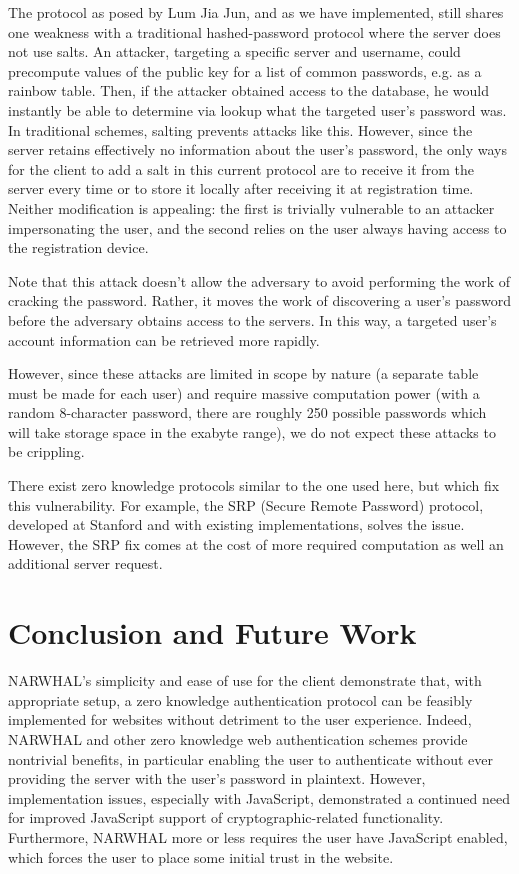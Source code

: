 \documentclass[11pt]{article}
\begin{document}
The protocol as posed by Lum Jia Jun, and as we have implemented, still shares one weakness with a traditional hashed-password protocol where the server does not use salts.  An attacker, targeting a specific server and username, could precompute values of the public key for a list of common passwords, e.g. as a rainbow table.  Then, if the attacker obtained access to the database, he would instantly be able to determine via lookup what the targeted user’s password was.  In traditional schemes, salting prevents attacks like this.  However, since the server retains effectively no information about the user’s password, the only ways for the client to add a salt in this current protocol are to receive it from the server every time or to store it locally after receiving it at registration time.  Neither modification is appealing: the first is trivially vulnerable to an attacker impersonating the user, and the second relies on the user always having access to the registration device.

Note that this attack doesn’t allow the adversary to avoid performing the work of cracking the password.  Rather, it moves the work of discovering a user’s password before the adversary obtains access to the servers.  In this way, a targeted user’s account information can be retrieved more rapidly.

However, since these attacks are limited in scope by nature (a separate table must be made for each user) and require massive computation power (with a random 8-character password, there are roughly 250 possible passwords which will take storage space in the exabyte range), we do not expect these attacks to be crippling.

There exist zero knowledge protocols similar to the one used here, but which fix this vulnerability.  For example, the SRP (Secure Remote Password) protocol, developed at Stanford and with existing implementations, solves the issue.  However, the SRP fix comes at the cost of more required computation as well an additional server request. \cite{Wu} 

\section{Conclusion and Future Work}

NARWHAL’s simplicity and ease of use for the client demonstrate that, with appropriate setup, a zero knowledge authentication protocol can be feasibly implemented for websites without detriment to the user experience.  Indeed, NARWHAL and other zero knowledge web authentication schemes provide nontrivial benefits, in particular enabling the user to authenticate without ever providing the server with the user’s password in plaintext.  However, implementation issues, especially with JavaScript, demonstrated a continued need for improved JavaScript support of cryptographic-related functionality.  Furthermore, NARWHAL more or less requires the user have JavaScript enabled, which forces the user to place some initial trust in the website.
\end{document}
